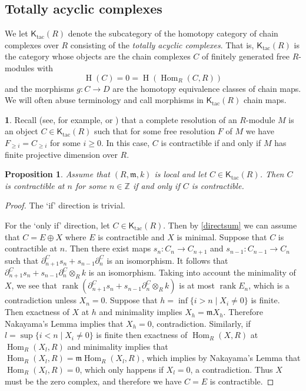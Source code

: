 \documentclass{amsart}[11pt]
\newcommand{\m}{{\mathfrak m}}
\newcommand{\rank}{\operatorname{rank}}
\newcommand{\Hom}{\operatorname{Hom}}
\newcommand{\Ktac}{\operatorname{\mathsf{K}_{tac}}\nolimits}
\newcommand{\K}{\operatorname{\mathsf K}\nolimits}
\renewcommand{\H}{\operatorname{H}\nolimits}
\numberwithin{equation}{section}
\theoremstyle{plain}
\newtheorem*{Main Theorem}{Main Theorem}
\newtheorem{proposition}[theorem]{Proposition}
\newtheorem{fact}{Fact}[theorem]
\theoremstyle{definition}
\newtheorem{chunk}[theorem]{}
\theoremstyle{remark}
\numberwithin{equation}{theorem}
\begin{document}
\subsection*{Totally acyclic complexes}
We let $\Ktac(R)$ denote the subcategory of the homotopy category of chain complexes over $R$ consisting of the \emph{totally acyclic complexes}. That is, $\Ktac(R)$ is the category whose objects are the chain complexes $C$ of finitely generated free $R$-modules with
\[
\H(C)=0=\H(\Hom_R(C,R))
\]
and the morphisms $g:C\to D$ are the homotopy equivalence classes of chain maps.
We will often abuse terminology and call morphisms in $\Ktac(R)$ chain maps.


\begin{chunk}\label{CR}
Recall (see, for example, \cite{AM} or \cite{B}) that a complete resolution of an $R$-module $M$ is an object $C\in\Ktac(R)$ such that for some free resolution $F$ of $M$ we have $F_{\ge i}=C_{\ge i}$ for some $i\ge 0$. In this case, $C$ is contractible if and only if $M$ has finite projective dimension over $R$.
\end{chunk}

\begin{proposition}\label{contractminimal} Assume that $(R,\m,k)$ is local and let $C\in\Ktac(R)$.  Then $C$ is contractible at $n$ for some $n\in\mathbb Z$ if and only if $C$ is contractible.
\end{proposition}

\begin{proof} The `if' direction is trivial.

For the `only if' direction, let $C\in\Ktac(R)$.  Then by \ref{directsum} we can assume that $C=E\oplus X$ where
$E$ is contractible and $X$ is minimal. Suppose that $C$ is contractible at $n$. Then there exist maps $s_n:C_n\to C_{n+1}$ and $s_{n-1}:C_{n-1}\to C_n$ such that $\partial^C_{n+1}s_n+s_{n-1}\partial^C_n$ is an isomorphism.
It follows that $\partial^C_{n+1}s_n+s_{n-1}\partial^C_n\otimes_Rk$ is an isomorphism.  Taking into account the minimality of $X$, we see that $\rank(\partial^C_{n+1}s_n+s_{n-1}\partial^C_n\otimes_Rk)$ is at most 
$\rank E_n$, which is a contradiction unless $X_n=0$. Suppose that $h=\inf\{i>n\mid X_i\ne 0\}$ is finite.
Then exactness of $X$ at $h$ and minimality implies $X_h=\m X_h$. Therefore Nakayama's Lemma implies 
that $X_h=0$, contradiction. Similarly, if $l=\sup\{i<n\mid X_i\ne 0\}$ is finite then exactness of
$\Hom_R(X,R)$ at $\Hom_R(X_l,R)$ and minimality implies that $\Hom_R(X_l,R)=\m \Hom_R(X_l,R)$, which implies 
by Nakayama's Lemma that $\Hom_R(X_l,R)=0$, which only happens if $X_l=0$, a contradiction.  Thus $X$ must be the zero complex, and therefore we have $C=E$ is contractible.
\end{proof}
\end{document}

